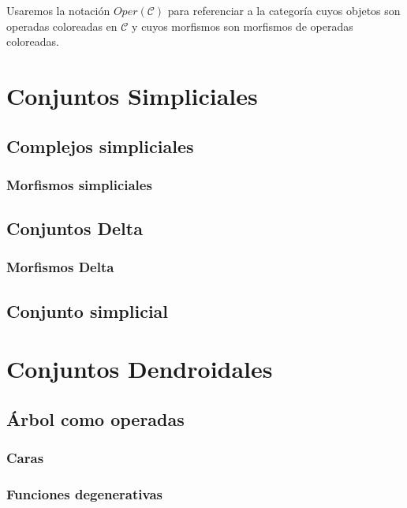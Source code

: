 \documentclass[11pt,a4paper,openright,oneside]{article}
\numberwithin{equation}{section}
\theoremstyle{definition}
\begin{document}
Usaremos la notaci\'on $Oper(\mathcal{C})$ para referenciar a la categor\'ia cuyos objetos son operadas coloreadas en $\mathcal{C}$ y cuyos morfismos son morfismos de operadas coloreadas.

\newpage


\section{Conjuntos Simpliciales}
\subsection{Complejos simpliciales}
\subsubsection{Morfismos simpliciales}
\subsection{Conjuntos Delta}
\subsubsection{Morfismos Delta}
\subsection{Conjunto simplicial}
\newpage


\section{Conjuntos Dendroidales}
\subsection{\'Arbol como operadas}
\subsubsection{Caras}
\subsubsection{Funciones degenerativas}
\end{document}
